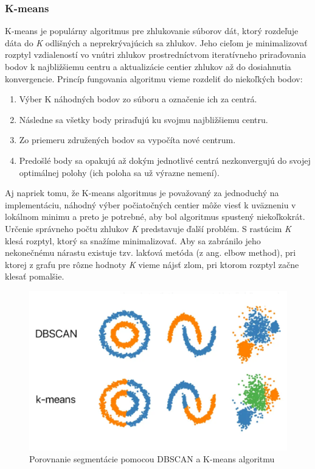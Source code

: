 \subsubsection{K-means}
\noindent K-means je populárny algoritmus pre zhlukovanie súborov dát, ktorý rozdeľuje dáta do \textit{K} odlišných a neprekrývajúcich sa zhlukov. Jeho cieľom je minimalizovať rozptyl vzdialeností vo vnútri zhlukov prostredníctvom iteratívneho priraďovania bodov k najbližšiemu centru a aktualizácie centier zhlukov až do dosiahnutia konvergencie. \cite{K-means}
\newline\indent Princíp fungovania algoritmu vieme rozdeliť do niekoľkých bodov:
\begin{enumerate}
    \item Výber K náhodných bodov zo súboru a označenie ich za centrá. 
    \item Následne sa všetky body priraďujú ku svojmu najbližšiemu centru.
    \item Zo priemeru združených bodov sa vypočíta nové centrum.
    \item Predošlé body sa opakujú až dokým jednotlivé centrá nezkonvergujú do svojej optimálnej  polohy (ich poloha sa už výrazne nemení).
\end{enumerate}
\indent Aj napriek tomu, že K-means algoritmus je považovaný za jednoduchý na implementáciu, náhodný výber počiatočných centier môže viesť k uväzneniu v lokálnom minimu a preto je potrebné, aby bol algoritmus spustený niekoľkokrát. Určenie správneho počtu zhlukov \textit{K} predstavuje ďalší problém. S rastúcim \textit{K} klesá rozptyl, ktorý sa snažíme minimalizovať. Aby sa zabránilo jeho nekonečnému nárastu existuje tzv. lakťová metóda (z ang. elbow method),  pri ktorej z grafu pre rôzne hodnoty \textit{K} vieme nájsť zlom, pri ktorom rozptyl začne klesať pomalšie. \cite{K-means}
\begin{figure}[!htbp]
  \centering
  \includegraphics[width=13cm]{img/DBSCAN_vs_Kmeans.png}
  \caption{Porovnanie segmentácie pomocou DBSCAN a K-means algoritmu \cite{DBSCANvsKmeans}}
  \label{segmentation_methods}
\end{figure} 

